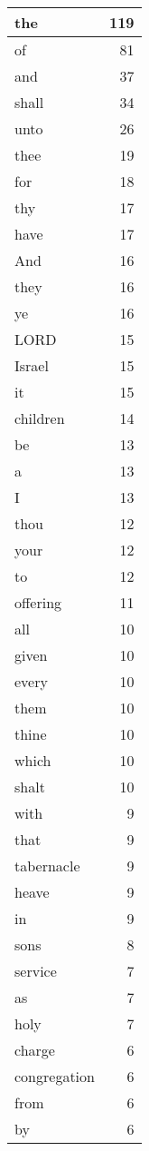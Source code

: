 \begin{center}
\begin{longtable}{l|r}
\hline \hline
\endlastfoot
the & 119 \\ \hline
of & 81 \\ \hline
and & 37 \\ \hline
shall & 34 \\ \hline
unto & 26 \\ \hline
thee & 19 \\ \hline
for & 18 \\ \hline
thy & 17 \\ \hline
have & 17 \\ \hline
And & 16 \\ \hline
they & 16 \\ \hline
ye & 16 \\ \hline
LORD & 15 \\ \hline
Israel & 15 \\ \hline
it & 15 \\ \hline
children & 14 \\ \hline
be & 13 \\ \hline
a & 13 \\ \hline
I & 13 \\ \hline
thou & 12 \\ \hline
your & 12 \\ \hline
to & 12 \\ \hline
offering & 11 \\ \hline
all & 10 \\ \hline
given & 10 \\ \hline
every & 10 \\ \hline
them & 10 \\ \hline
thine & 10 \\ \hline
which & 10 \\ \hline
shalt & 10 \\ \hline
with & 9 \\ \hline
that & 9 \\ \hline
tabernacle & 9 \\ \hline
heave & 9 \\ \hline
in & 9 \\ \hline
sons & 8 \\ \hline
service & 7 \\ \hline
as & 7 \\ \hline
holy & 7 \\ \hline
charge & 6 \\ \hline
congregation & 6 \\ \hline
from & 6 \\ \hline
by & 6 \\ \hline

\end{longtable}
\end{center}
